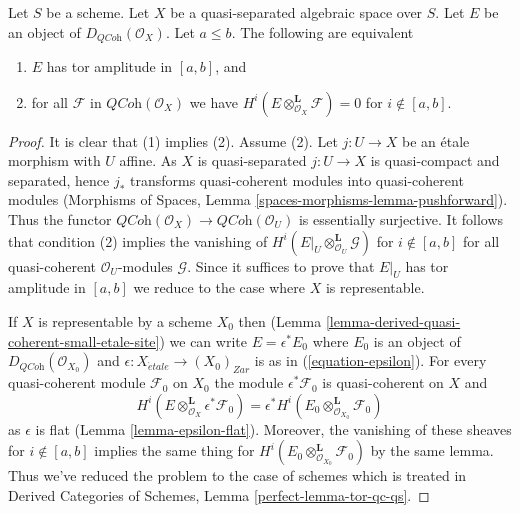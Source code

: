 \begin{lemma}
\label{lemma-tor-qc-qs}
Let $S$ be a scheme. Let $X$ be a quasi-separated algebraic space over $S$.
Let $E$ be an object of $D_{\textit{QCoh}}(\mathcal{O}_X)$. Let $a \leq b$.
The following are equivalent
\begin{enumerate}
\item $E$ has tor amplitude in $[a, b]$, and
\item for all $\mathcal{F}$ in $\textit{QCoh}(\mathcal{O}_X)$
we have $H^i(E \otimes_{\mathcal{O}_X}^\mathbf{L} \mathcal{F}) = 0$
for $i \not \in [a, b]$.
\end{enumerate}
\end{lemma}

\begin{proof}
It is clear that (1) implies (2). Assume (2). Let $j : U \to X$ be
an \'etale morphism with $U$ affine. As $X$ is quasi-separated $j : U \to X$
is quasi-compact and separated, hence $j_*$ transforms quasi-coherent
modules into quasi-coherent modules (Morphisms of Spaces, Lemma
\ref{spaces-morphisms-lemma-pushforward}).
Thus the functor
$\textit{QCoh}(\mathcal{O}_X) \to \textit{QCoh}(\mathcal{O}_U)$
is essentially surjective. It follows that condition (2)
implies the vanishing of
$H^i(E|_U \otimes_{\mathcal{O}_U}^\mathbf{L} \mathcal{G})$
for $i \not \in [a, b]$ for all quasi-coherent $\mathcal{O}_U$-modules
$\mathcal{G}$. Since it suffices to prove that $E|_U$ has tor amplitude
in $[a, b]$ we reduce to the case where $X$ is representable.

\medskip\noindent
If $X$ is representable by a scheme $X_0$ then
(Lemma \ref{lemma-derived-quasi-coherent-small-etale-site})
we can write $E = \epsilon^*E_0$ where $E_0$ is an object of
$D_{\textit{QCoh}}(\mathcal{O}_{X_0})$ and
$\epsilon : X_{\acute{e}tale} \to (X_0)_{Zar}$ is as in
(\ref{equation-epsilon}). For every quasi-coherent module
$\mathcal{F}_0$ on $X_0$ the module $\epsilon^*\mathcal{F}_0$
is quasi-coherent on $X$ and
$$
H^i(E \otimes_{\mathcal{O}_X}^\mathbf{L} \epsilon^*\mathcal{F}_0)
=
\epsilon^*H^i(E_0 \otimes_{\mathcal{O}_{X_0}}^\mathbf{L} \mathcal{F}_0)
$$
as $\epsilon$ is flat (Lemma \ref{lemma-epsilon-flat}).
Moreover, the vanishing of these sheaves for $i \not \in [a, b]$
implies the same thing for
$H^i(E_0 \otimes_{\mathcal{O}_{X_0}}^\mathbf{L} \mathcal{F}_0)$
by the same lemma. Thus we've reduced the problem to the case
of schemes which is treated in
Derived Categories of Schemes, Lemma \ref{perfect-lemma-tor-qc-qs}.
\end{proof}









